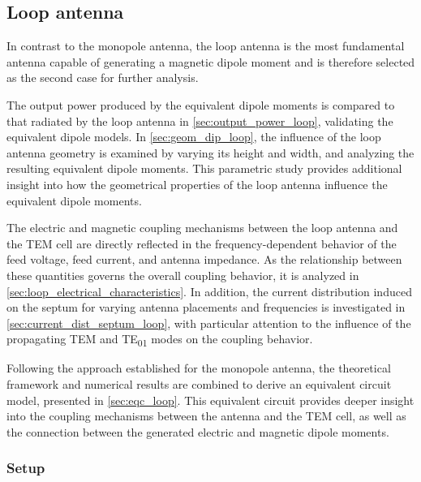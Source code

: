 \subsection{Loop antenna}\label{sec:loop_sim}

In contrast to the monopole antenna, the loop antenna is the most fundamental antenna capable of generating a magnetic dipole moment and is therefore selected as the second case for further analysis.

The output power produced by the equivalent dipole moments is compared to that radiated by the loop antenna in \cref{sec:output_power_loop}, validating the equivalent dipole models. In \cref{sec:geom_dip_loop}, the influence of the loop antenna geometry is examined by varying its height and width, and analyzing the resulting equivalent dipole moments. This parametric study provides additional insight into how the geometrical properties of the loop antenna influence the equivalent dipole moments.

The electric and magnetic coupling mechanisms between the loop antenna and the TEM cell are directly reflected in the frequency-dependent behavior of the feed voltage, feed current, and antenna impedance. As the relationship between these quantities governs the overall coupling behavior, it is analyzed in \cref{sec:loop_electrical_characteristics}. In addition, the current distribution induced on the septum for varying antenna placements and frequencies is investigated in \cref{sec:current_dist_septum_loop}, with particular attention to the influence of the propagating TEM and TE\textsubscript{01} modes on the coupling behavior.

Following the approach established for the monopole antenna, the theoretical framework and numerical results are combined to derive an equivalent circuit model, presented in \cref{sec:eqc_loop}. This equivalent circuit provides deeper insight into the coupling mechanisms between the antenna and the TEM cell, as well as the connection between the generated electric and magnetic dipole moments.

\subsubsection{Setup}

\FloatBarrier

